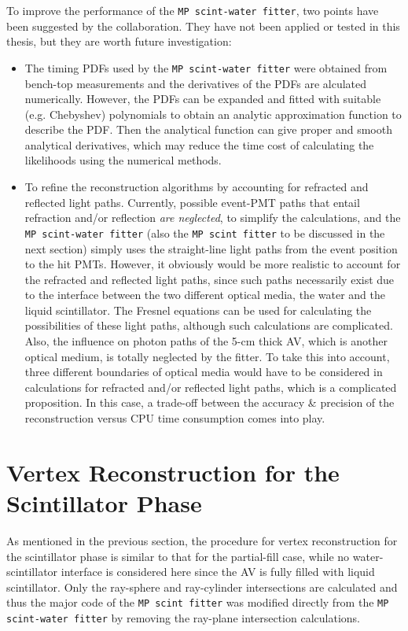 To improve the performance of the \texttt{MP scint-water fitter}, two points have been suggested by the collaboration. They have not been applied or tested in this thesis, but they are worth future investigation:
\begin{itemize}
	\item The timing PDFs used by the \texttt{MP scint-water fitter} were obtained from bench-top measurements and the derivatives of the PDFs are alculated numerically. However, the PDFs can be expanded and fitted with suitable (e.g. Chebyshev) polynomials to obtain an analytic approximation function to describe the PDF\cite{press2007numerical}. Then the analytical function can give proper and smooth analytical derivatives, which may reduce the time cost of calculating the likelihoods using the numerical methods.	
	
	\item To refine the reconstruction algorithms by accounting for refracted and reflected light paths. Currently, possible event-PMT paths that entail refraction and/or reflection {\em are neglected}, to simplify the calculations, and the \texttt{MP scint-water fitter} (also the \texttt{MP scint fitter} to be discussed in the next section) simply uses the straight-line light paths from the event position to the hit PMTs. However, it obviously would be more realistic to account for the refracted and reflected light paths, since such paths necessarily exist due to the interface between the two different optical media, the water and the liquid scintillator. The Fresnel equations can be used for calculating the possibilities of these light paths\cite{partialWater}, although such calculations are complicated. Also, the influence on photon paths of the 5-cm thick AV, which is another optical medium, is totally neglected by the fitter. To take this into account, three different boundaries of optical media would have to be considered in calculations for refracted and/or reflected light paths, which is a complicated proposition. In this case, a trade-off between the accuracy \& precision of the reconstruction versus CPU time consumption comes into play.
\end{itemize}

\section{Vertex Reconstruction for the Scintillator Phase}\label{sect:scintFitter}

As mentioned in the previous section, the procedure for vertex reconstruction for the scintillator phase is similar to that for the partial-fill case, while no water-scintillator interface is considered here since the AV is fully filled with liquid scintillator. Only the ray-sphere and ray-cylinder intersections are calculated and thus the major code of the \texttt{MP scint fitter} was modified directly from the \texttt{MP scint-water fitter} by removing the ray-plane intersection calculations.

